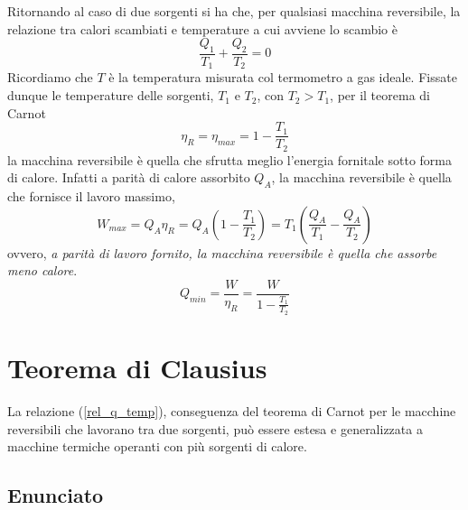 \documentclass[class=book, crop=false, oneside, 12pt]{standalone}
\begin{document}
Ritornando al caso di due sorgenti si ha che, per qualsiasi macchina reversibile, la relazione tra calori scambiati e temperature a cui avviene lo scambio è
\begin{equation} \label{rel_q_temp}
    \frac{Q_1}{T_1} + \frac{Q_2}{T_2} = 0
\end{equation}
Ricordiamo che \(T\) è la temperatura misurata col termometro a gas ideale. 
Fissate dunque le temperature delle sorgenti, \(T_1\) e \(T_2\), con \(T_2 > T_1\), per il teorema di Carnot
\begin{equation}
    \eta_R = \eta_{max} = 1- \frac{T_1}{T_2}
\end{equation}
la macchina reversibile è quella che sfrutta meglio l'energia fornitale sotto forma di calore.
Infatti a parità di calore assorbito \(Q_A\), la macchina reversibile è quella che fornisce il lavoro massimo, 
\begin{equation}
    W_{max} = Q_A \eta_R = Q_A \left(1 - \frac{T_1}{T_2}\right) = T_1 \left(\frac{Q_A}{T_1} - \frac{Q_A}{T_2}\right)
\end{equation}
ovvero, \emph{a parità di lavoro fornito, la macchina reversibile è quella che assorbe meno calore}.
\begin{equation}
    Q_{min} = \frac{W}{\eta_R} = \frac{W}{1- \frac{T_1}{T_2}}
\end{equation}

\section{Teorema di Clausius}

La relazione (\ref{rel_q_temp}), conseguenza del teorema di Carnot per le macchine reversibili che lavorano tra due sorgenti, può essere estesa e generalizzata a macchine termiche operanti con più sorgenti di calore. 

\subsection{Enunciato}
\end{document}
